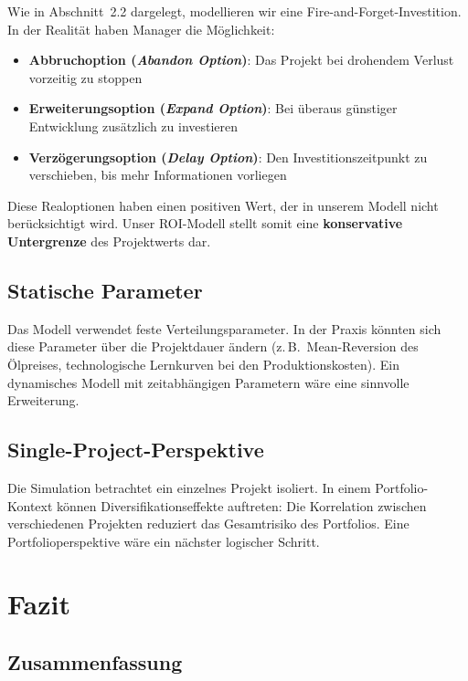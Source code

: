 \documentclass[12pt,a4paper]{article}
\begin{document}
Wie in Abschnitt~2.2 dargelegt, modellieren wir eine \glqq Fire-and-Forget\grqq{}-Investition. In der Realität haben Manager die Möglichkeit:

\begin{itemize}[itemsep=2pt]
  \item \textbf{Abbruchoption (\textit{Abandon Option})}: Das Projekt bei drohendem Verlust vorzeitig zu stoppen
  \item \textbf{Erweiterungsoption (\textit{Expand Option})}: Bei überaus günstiger Entwicklung zusätzlich zu investieren
  \item \textbf{Verzögerungsoption (\textit{Delay Option})}: Den Investitionszeitpunkt zu verschieben, bis mehr Informationen vorliegen
\end{itemize}

Diese Realoptionen haben einen positiven Wert, der in unserem Modell nicht berücksichtigt wird. Unser ROI-Modell stellt somit eine \textbf{konservative Untergrenze} des Projektwerts dar.

\subsection{Statische Parameter}

Das Modell verwendet feste Verteilungsparameter. In der Praxis könnten sich diese Parameter über die Projektdauer ändern (z.\,B.\ Mean-Reversion des Ölpreises, technologische Lernkurven bei den Produktionskosten). Ein dynamisches Modell mit zeitabhängigen Parametern wäre eine sinnvolle Erweiterung.

\subsection{Single-Project-Perspektive}

Die Simulation betrachtet ein einzelnes Projekt isoliert. In einem Portfolio-Kontext können Diversifikationseffekte auftreten: Die Korrelation zwischen verschiedenen Projekten reduziert das Gesamtrisiko des Portfolios. Eine Portfolioperspektive wäre ein nächster logischer Schritt.

\section{Fazit}

\subsection{Zusammenfassung}
\end{document}

